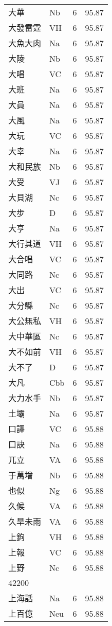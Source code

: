 \documentclass[twocolumn]{book}
\begin{document}
\begin{supertabular}{llrr}
大華 & Nb & 6 &  95.87\\
大發雷霆 & VH & 6 &  95.87\\
大魚大肉 & Na & 6 &  95.87\\
大陵 & Nb & 6 &  95.87\\
大唱 & VC & 6 &  95.87\\
大班 & Na & 6 &  95.87\\
大員 & Na & 6 &  95.87\\
大風 & Na & 6 &  95.87\\
大玩 & VC & 6 &  95.87\\
大幸 & Na & 6 &  95.87\\
大和民族 & Nb & 6 &  95.87\\
大受 & VJ & 6 &  95.87\\
大貝湖 & Nc & 6 &  95.87\\
大步 & D & 6 &  95.87\\
大亨 & Na & 6 &  95.87\\
大行其道 & VH & 6 &  95.87\\
大合唱 & VC & 6 &  95.87\\
大同路 & Nc & 6 &  95.87\\
大出 & VC & 6 &  95.87\\
大分縣 & Nc & 6 &  95.87\\
大公無私 & VH & 6 &  95.87\\
大中華區 & Nc & 6 &  95.87\\
大不如前 & VH & 6 &  95.87\\
大不了 & D & 6 &  95.87\\
大凡 & Cbb & 6 &  95.87\\
大力水手 & Nb & 6 &  95.87\\
土壩 & Na & 6 &  95.87\\
口譯 & VC & 6 &  95.88\\
口訣 & Na & 6 &  95.88\\
兀立 & VA & 6 &  95.88\\
于萬增 & Nb & 6 &  95.88\\
也似 & Ng & 6 &  95.88\\
久候 & VA & 6 &  95.88\\
久旱未雨 & VA & 6 &  95.88\\
上鉤 & VH & 6 &  95.88\\
上報 & VC & 6 &  95.88\\
上野 & Nc & 6 &  95.88\\
42200\\
上海話 & Na & 6 &  95.88\\
上百億 & Neu & 6 &  95.88\\

\end{supertabular}
\end{document}

